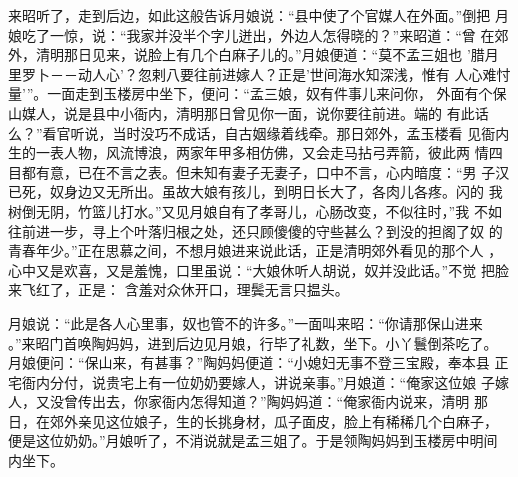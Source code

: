 来昭听了，走到后边，如此这般告诉月娘说：“县中使了个官媒人在外面。”倒把
月娘吃了一惊，说：“我家并没半个字儿迸出，外边人怎得晓的？”来昭道：“曾
在郊外，清明那日见来，说脸上有几个白麻子儿的。”月娘便道：“莫不孟三姐也
'腊月里罗卜－－动人心'？忽剌八要往前进嫁人？正是'世间海水知深浅，惟有
人心难忖量'”。一面走到玉楼房中坐下，便问：“孟三娘，奴有件事儿来问你，
外面有个保山媒人，说是县中小衙内，清明那日曾见你一面，说你要往前进。端的
有此话么？”看官听说，当时没巧不成话，自古姻缘着线牵。那日郊外，孟玉楼看
见衙内生的一表人物，风流博浪，两家年甲多相仿佛，又会走马拈弓弄箭，彼此两
情四目都有意，已在不言之表。但未知有妻子无妻子，口中不言，心内暗度：“男
子汉已死，奴身边又无所出。虽故大娘有孩儿，到明日长大了，各肉儿各疼。闪的
我树倒无阴，竹篮儿打水。”又见月娘自有了孝哥儿，心肠改变，不似往时，”我
不如往前进一步，寻上个叶落归根之处，还只顾傻傻的守些甚么？到没的担阁了奴
的青春年少。”正在思慕之间，不想月娘进来说此话，正是清明郊外看见的那个人
，心中又是欢喜，又是羞愧，口里虽说：“大娘休听人胡说，奴并没此话。”不觉
把脸来飞红了，正是：
含羞对众休开口，理鬓无言只揾头。

月娘说：“此是各人心里事，奴也管不的许多。”一面叫来昭：“你请那保山进来
。”来昭门首唤陶妈妈，进到后边见月娘，行毕了礼数，坐下。小丫鬟倒茶吃了。
月娘便问：“保山来，有甚事？”陶妈妈便道：“小媳妇无事不登三宝殿，奉本县
正宅衙内分付，说贵宅上有一位奶奶要嫁人，讲说亲事。”月娘道：“俺家这位娘
子嫁人，又没曾传出去，你家衙内怎得知道？”陶妈妈道：“俺家衙内说来，清明
那日，在郊外亲见这位娘子，生的长挑身材，瓜子面皮，脸上有稀稀几个白麻子，
便是这位奶奶。”月娘听了，不消说就是孟三姐了。于是领陶妈妈到玉楼房中明间
内坐下。

